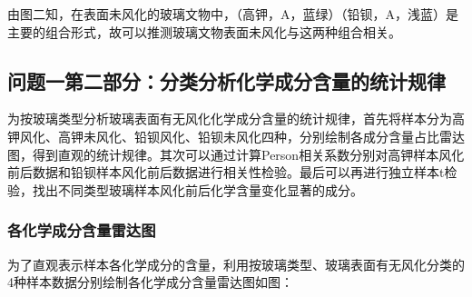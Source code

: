\documentclass[withoutpreface,bwprint]{cumcmthesis}
\begin{document}
由图二知，在表面未风化的玻璃文物中，（高钾，A，蓝绿）（铅钡，A，浅蓝）是主要的组合形式，故可以推测玻璃文物表面未风化与这两种组合相关。

\subsection{问题一第二部分：分类分析化学成分含量的统计规律}
为按玻璃类型分析玻璃表面有无风化化学成分含量的统计规律，首先将样本分为高钾风化、高钾未风化、铅钡风化、铅钡未风化四种，分别绘制各成分含量占比雷达图，得到直观的统计规律。其次可以通过计算Person相关系数分别对高钾样本风化前后数据和铅钡样本风化前后数据进行相关性检验。最后可以再进行独立样本t检验，找出不同类型玻璃样本风化前后化学含量变化显著的成分。
\subsubsection{各化学成分含量雷达图}
为了直观表示样本各化学成分的含量，利用按玻璃类型、玻璃表面有无风化分类的4种样本数据分别绘制各化学成分含量雷达图如图：
\end{document}
